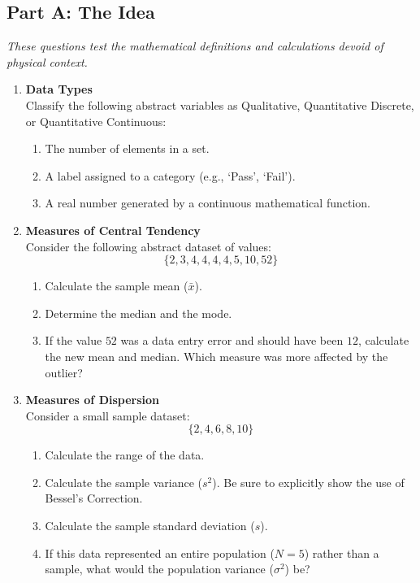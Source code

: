 

\subsection*{Part A: The Idea}
\textit{These questions test the mathematical definitions and calculations devoid of physical context.}

\begin{enumerate}[label=\textbf{Q\arabic*.}, leftmargin=*]
    \item \textbf{Data Types} \\
    Classify the following abstract variables as Qualitative, Quantitative Discrete, or Quantitative Continuous:
    \begin{enumerate}[label=\arabic*.]
        \item The number of elements in a set.
        \item A label assigned to a category (e.g., \lq Pass\rq , \lq Fail\rq ).
        \item A real number generated by a continuous mathematical function.
    \end{enumerate}
    \vspace{0.3cm}

    \item \textbf{Measures of Central Tendency} \\
    Consider the following abstract dataset of values: 
    \[ \{ 2, 3, 4, 4, 4, 4 ,5, 10, 52 \} \]
    \begin{enumerate}[label=\arabic*.]
        \item Calculate the sample mean ($\bar{x}$).
        \item Determine the median and the mode.
        \item If the value $52$ was a data entry error and should have been $12$, calculate the new mean and median. Which measure was more affected by the outlier?
    \end{enumerate}
    \vspace{0.3cm}

    \item \textbf{Measures of Dispersion} \\
    Consider a small sample dataset: 
    \[ \{ 2, 4, 6, 8, 10 \} \]
    \begin{enumerate}[label=\arabic*.]
        \item Calculate the range of the data.
        \item Calculate the sample variance ($s^2$). Be sure to explicitly show the use of Bessel's Correction.
        \item Calculate the sample standard deviation ($s$). 
        \item If this data represented an entire population ($N=5$) rather than a sample, what would the population variance ($\sigma^2$) be?
    \end{enumerate}

\end{enumerate}

